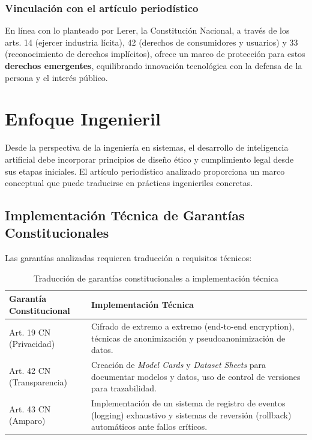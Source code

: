 \documentclass[10pt, a4paper]{article}
\begin{document}
\subsubsection*{Vinculación con el artículo periodístico}
En línea con lo planteado por Lerer, la Constitución Nacional, a través de los arts. 14 (ejercer industria lícita), 42 (derechos de consumidores y usuarios) y 33 (reconocimiento de derechos implícitos), ofrece un marco de protección para estos \textbf{derechos emergentes}, equilibrando innovación tecnológica con la defensa de la persona y el interés público.


\onecolumn %

\section{Enfoque Ingenieril}
\label{sec:enfoque_ingenieril}

Desde la perspectiva de la ingeniería en sistemas, el desarrollo de inteligencia artificial debe incorporar principios de diseño ético y cumplimiento legal desde sus etapas iniciales. El artículo periodístico analizado proporciona un marco conceptual que puede traducirse en prácticas ingenieriles concretas.

\subsection{Implementación Técnica de Garantías Constitucionales}
Las garantías analizadas requieren traducción a requisitos técnicos:

\begin{table}[h]
\centering
\caption{Traducción de garantías constitucionales a implementación técnica}
\begin{tabularx}{\textwidth}{lX}
\toprule
\textbf{Garantía Constitucional} & \textbf{Implementación Técnica} \\
\midrule
Art. 19 CN (Privacidad) & Cifrado de extremo a extremo (end-to-end encryption), técnicas de anonimización y pseudoanonimización de datos. \\
\addlinespace
Art. 42 CN (Transparencia) & Creación de \textit{Model Cards} y \textit{Dataset Sheets} para documentar modelos y datos, uso de control de versiones para trazabilidad. \\
\addlinespace
Art. 43 CN (Amparo) & Implementación de un sistema de registro de eventos (logging) exhaustivo y sistemas de reversión (rollback) automáticos ante fallos críticos. \\
\bottomrule
\end{tabularx}
\end{table}
\end{document}
